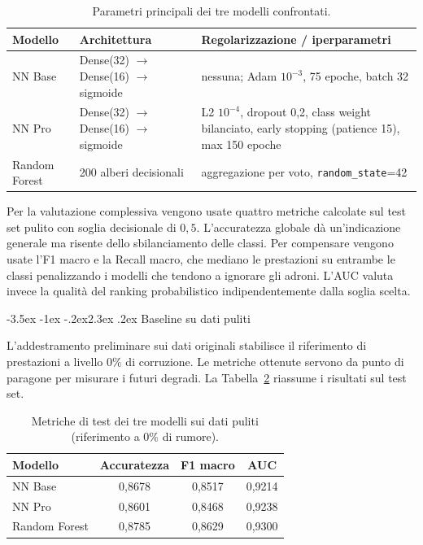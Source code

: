 \documentclass[12pt,a4paper]{article}
\makeatletter
\renewcommand\section{\@startsection{section}{1}{\z@}%
  {-3.5ex \@plus -1ex \@minus -.2ex}{2.3ex \@plus.2ex}%
  {\normalfont\Large\bfseries}}
\makeatother
\begin{document}
\begin{table}[H]\centering\small
	\caption{Parametri principali dei tre modelli confrontati.}\label{tab:modelli}
	\begin{tabular}{@{}l p{4.6cm} p{6.8cm}@{}}
		\toprule
		\textbf{Modello} & \textbf{Architettura}                    & \textbf{Regolarizzazione / iperparametri}                                                        \\
		\midrule
		NN Base          & Dense(32) $\to$ Dense(16) $\to$ sigmoide & nessuna; Adam $10^{-3}$, 75 epoche, batch 32                                                     \\[4pt]
		NN Pro           & Dense(32) $\to$ Dense(16) $\to$ sigmoide & L2 $10^{-4}$, dropout 0,2, class weight bilanciato, early stopping (patience 15), max 150 epoche \\[4pt]
		Random Forest    & 200 alberi decisionali                   & aggregazione per voto, \texttt{random\_state}=42                                                 \\
		\bottomrule
	\end{tabular}
\end{table}

Per la valutazione complessiva vengono usate quattro metriche calcolate sul test set pulito con soglia decisionale di $0{,}5$. L'accuratezza globale dà un'indicazione generale ma risente dello sbilanciamento delle classi. Per compensare vengono usate l'F1 macro e la Recall macro, che mediano le prestazioni su entrambe le classi penalizzando i modelli che tendono a ignorare gli adroni. L'AUC valuta invece la qualità del ranking probabilistico indipendentemente dalla soglia scelta.

\section{Baseline su dati puliti}\label{sec:baseline}

L'addestramento preliminare sui dati originali stabilisce il riferimento di prestazioni a livello $0\%$ di corruzione. Le metriche ottenute servono da punto di paragone per misurare i futuri degradi. La Tabella~\ref{tab:baseline} riassume i risultati sul test set.

\begin{table}[H]\centering\small
	\caption{Metriche di test dei tre modelli sui dati puliti (riferimento a 0\% di rumore).}\label{tab:baseline}
	\begin{tabular}{lccc}
		\toprule
		\textbf{Modello} & \textbf{Accuratezza} & \textbf{F1 macro} & \textbf{AUC} \\
		\midrule
		NN Base          & 0,8678               & 0,8517            & 0,9214       \\
		NN Pro           & 0,8601               & 0,8468            & 0,9238       \\
		Random Forest    & 0,8785               & 0,8629            & 0,9300       \\
		\bottomrule
	\end{tabular}
\end{table}
\end{document}
